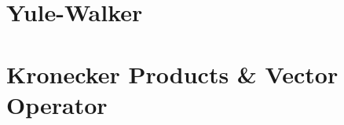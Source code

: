 \section{Yule-Walker}\label{appendix:yule-walker}

\section{Kronecker Products \& Vector Operator}\label{appendix:krprod-vec}